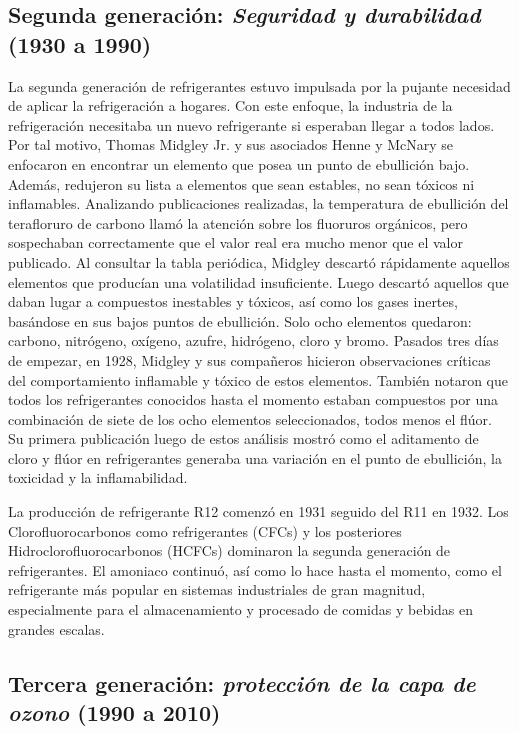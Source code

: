 	\subsection{Segunda generación: \emph{Seguridad y durabilidad} (1930 a 1990)}

	La segunda generación de refrigerantes estuvo impulsada por la pujante necesidad de aplicar la refrigeración a hogares. Con este enfoque, la industria de la refrigeración necesitaba un nuevo refrigerante si esperaban llegar a todos lados. Por tal motivo, Thomas Midgley Jr. y sus asociados Henne y McNary se enfocaron en encontrar un elemento que posea un punto de ebullición bajo. Además, redujeron su lista a elementos que sean estables, no sean tóxicos ni inflamables. Analizando publicaciones realizadas, la temperatura de ebullición del terafloruro de carbono llamó la atención sobre los fluoruros orgánicos, pero sospechaban correctamente que el valor real era mucho menor que el valor publicado. Al consultar la tabla periódica, Midgley descartó rápidamente aquellos elementos que producían una volatilidad insuficiente. Luego descartó aquellos que daban lugar a compuestos inestables y tóxicos, así como los gases inertes, basándose en sus bajos puntos de ebullición. Solo ocho elementos quedaron: carbono, nitrógeno, oxígeno, azufre, hidrógeno, cloro y bromo. Pasados tres días de empezar, en 1928, Midgley y sus compañeros hicieron observaciones críticas del comportamiento inflamable y tóxico de estos elementos. También notaron que todos los refrigerantes conocidos hasta el momento estaban compuestos por una combinación de siete de los ocho elementos seleccionados, todos menos el flúor. Su primera publicación luego de estos análisis mostró como el aditamento de cloro y flúor en refrigerantes generaba una variación en el punto de ebullición, la toxicidad y la inflamabilidad.

	La producción de refrigerante R12 comenzó en 1931 seguido del R11 en 1932. Los Clorofluorocarbonos como refrigerantes (CFCs) y los posteriores Hidroclorofluorocarbonos (HCFCs) dominaron la segunda generación de refrigerantes. El amoniaco continuó, así como lo hace hasta el momento, como el refrigerante más popular en sistemas industriales de gran magnitud, especialmente para el almacenamiento y procesado de comidas y bebidas en grandes escalas.

	\subsection{Tercera generación: \emph{protección de la capa de ozono}  (1990 a 2010)}

